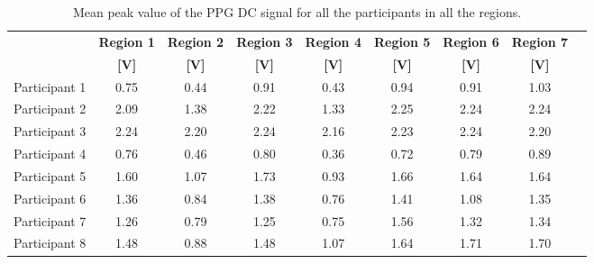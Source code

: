 \begin{table}[!htbp]
	\caption[Mean peak value of the PPG DC signal for all participants in all regions]{Mean peak value of the PPG DC signal for all the participants in all the regions.}
	\label{tbl:PPG RED DC}
	\centering \small
	\begin{tabular}{lcccccccc}
		\toprule
		& \textbf{Region 1}
		& \textbf{Region 2}
		& \textbf{Region 3}
		& \textbf{Region 4}
		& \textbf{Region 5}
		& \textbf{Region 6}
		& \textbf{Region 7} \\
		& \textbf{[\si{\volt}]}
		& \textbf{[\si{\volt}]}
		& \textbf{[\si{\volt}]}		
		& \textbf{[\si{\volt}]}		
		& \textbf{[\si{\volt}]}
		& \textbf{[\si{\volt}]}
		& \textbf{[\si{\volt}]}\\\midrule
		Participant 1    &     0.75      &     0.44      &     0.91      &     0.43      &     0.94      &     0.91      &     1.03      \\  
		Participant 2    &     2.09      &     1.38      &     2.22      &     1.33      &     2.25      &     2.24      &     2.24      \\  
		Participant 3    &     2.24      &     2.20      &     2.24      &     2.16      &     2.23      &     2.24      &     2.20      \\  
		Participant 4    &     0.76      &     0.46      &     0.80      &     0.36      &     0.72      &     0.79      &     0.89      \\  
		Participant 5    &     1.60      &     1.07      &     1.73      &     0.93      &     1.66      &     1.64      &     1.64      \\  
		Participant 6    &     1.36      &     0.84      &     1.38      &     0.76      &     1.41      &     1.08      &     1.35      \\  
		Participant 7    &     1.26      &     0.79      &     1.25      &     0.75      &     1.56      &     1.32      &     1.34      \\  
		Participant 8    &     1.48      &     0.88      &     1.48      &     1.07      &     1.64      &     1.71      &     1.70      \\  
		\bottomrule
	\end{tabular}
\end{table}

